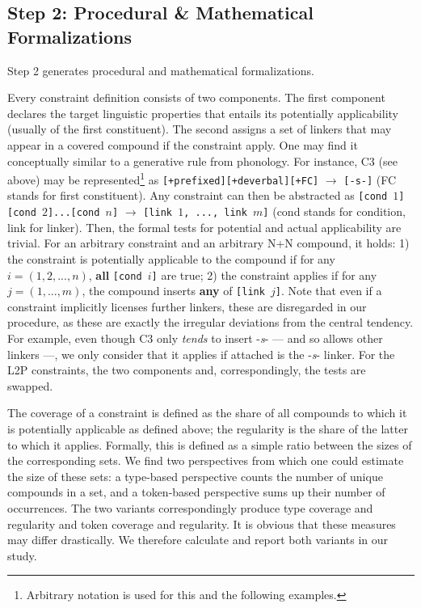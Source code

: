 \documentclass[10pt, a4paper]{article}
\begin{document}
\subsection{Step 2: Procedural \& Mathematical Formalizations}
\label{sec:formal}

Step 2 generates procedural and mathematical formalizations.

Every constraint definition consists of two components. The first component declares the target linguistic properties that entails its potentially applicability (usually of the first constituent). The second assigns a set of linkers that may appear in a covered compound if the constraint apply. One may find it conceptually similar to a generative rule from phonology. For instance, C3 (see above) may be represented\footnote{Arbitrary notation is used for this and the following examples.} as \mbox{\texttt{[+prefixed][+deverbal][+FC]}} $\rightarrow$ \mbox{\texttt{[-s-]}} (FC stands for first constituent). Any constraint can then be abstracted as \mbox{\texttt{[cond $1$][cond $2$]...[cond $n$]}} $\rightarrow$ \mbox{\texttt{[link $1$, ..., link $m$]}} (cond stands for condition, link for linker). Then, the formal tests for potential and actual applicability are trivial. For an arbitrary constraint and an arbitrary N+N compound, it holds: 1) the constraint is potentially applicable to the compound if for any \mbox{$i = (1, 2, ..., n)$}, \textbf{all} \mbox{\texttt{[cond $i$]}} are true; 2) the constraint applies if for any \mbox{$j = (1, ..., m)$}, the compound inserts \textbf{any} of \mbox{\texttt{[link $j$]}}. Note that even if a constraint implicitly licenses further linkers, these are disregarded in our procedure, as these are exactly the irregular deviations from the central tendency. For example, even though C3 only \textit{tends} to insert -\textit{s}- --- and so allows other linkers ---, we only consider that it applies if attached is the -\textit{s}- linker. For the L2P constraints, the two components and, correspondingly, the tests are swapped.

The coverage of a constraint is defined as the share of all compounds to which it is potentially applicable as defined above; the regularity is the share of the latter to which it applies. Formally, this is defined as a simple ratio between the sizes of the corresponding sets. We find two perspectives from which one could estimate the size of these sets: a type-based perspective counts the number of unique compounds in a set, and a token-based perspective sums up their number of occurrences. The two variants correspondingly produce type coverage and regularity and token coverage and regularity. It is obvious that these measures may differ drastically. We therefore calculate and report both variants in our study.
\end{document}
